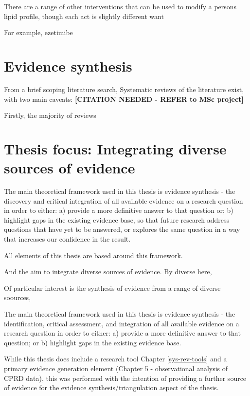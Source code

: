 \documentclass[a4paper,nobind]{templates/ociamthesis}
\begin{document}
There are a range of other interventions that can be used to modify a persons lipid profile, though each act is slightly different want

For example, ezetimibe

\hypertarget{evidence-synthesis}{%
\section{Evidence synthesis}\label{evidence-synthesis}}

From a brief scoping literature search, Systematic reviews of the literature exist, with two main caveats: \textbf{{[}CITATION NEEDED - REFER to MSc project{]}}

Firstly, the majority of reviews

\hypertarget{thesis-focus-integrating-diverse-sources-of-evidence}{%
\section{Thesis focus: Integrating diverse sources of evidence}\label{thesis-focus-integrating-diverse-sources-of-evidence}}

The main theoretical framework used in this thesis is evidence synthesis - the discovery and critical integration of all available evidence on a research question in order to either: a) provide a more definitive answer to that question or; b) highlight gaps in the existing evidence base, so that future research address questions that have yet to be answered, or explores the same question in a way that increases our confidence in the result.

All elements of this thesis are based around this framework.

And the aim to integrate diverse sources of evidence. By diverse here,

Of particular interest is the synthesis of evidence from a range of diverse soources,

The main theoretical framework used in this thesis is evidence synthesis - the identification, critical assessment, and integration of all available evidence on a research question in order to either: a) provide a more definitive answer to that question; or b) highlight gaps in the existing evidence base.

While this thesis does include a research tool Chapter \ref{sys-rev-tools} and a primary evidence generation element (Chapter 5 - observational analysis of CPRD data), this was performed with the intention of providing a further source of evidence for the evidence synthesis/triangulation aspect of the thesis.
\end{document}
